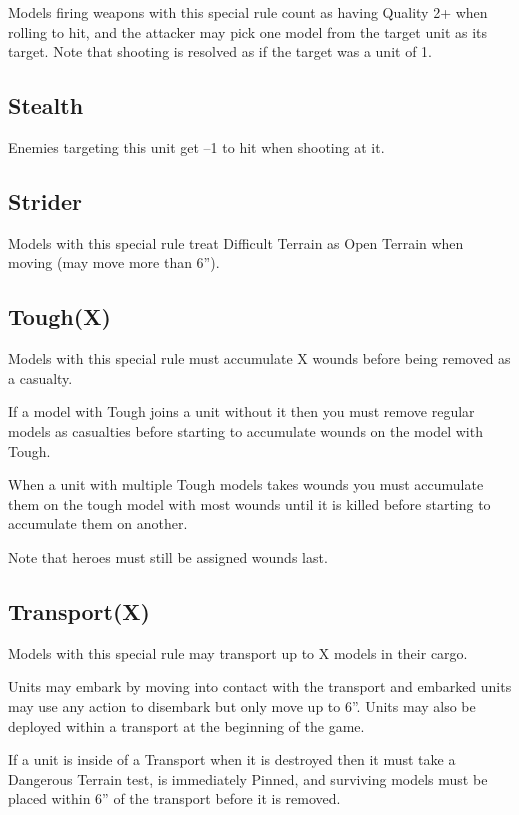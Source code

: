 \documentclass[9pt, a4paper, bookmarks=false]{extarticle}            %
\begin{document}
\begin{multicols*}{2}
Models firing weapons with this special rule count as having Quality 2+ when rolling to hit, and the attacker may pick one model from the target unit as its target.
Note that shooting is resolved as if the target was a unit of 1.

\subsection{Stealth}

Enemies targeting this unit get –1 to hit when shooting at it.

\subsection{Strider}

Models with this special rule treat Difficult Terrain as Open Terrain when moving (may move more than 6”).

\subsection{Tough(X)}

Models with this special rule must accumulate X wounds before being removed as a casualty.

If a model with Tough joins a unit without it then you must remove regular models as casualties before starting to accumulate wounds on the model with Tough.

When a unit with multiple Tough models takes wounds you must accumulate them on the tough model with most wounds until it is killed before starting to accumulate them on another.

Note that heroes must still be assigned wounds last.

\subsection{Transport(X)}

Models with this special rule may transport up to X models in their cargo.

Units may embark by moving into contact with the transport and embarked units may use any action to disembark but only move up to 6”. Units may also be deployed within a transport at the beginning of the game.

If a unit is inside of a Transport when it is destroyed then it must take a Dangerous Terrain test, is immediately Pinned, and surviving models must be placed within 6” of the transport before it is removed.

\end{multicols*}
\end{document}
